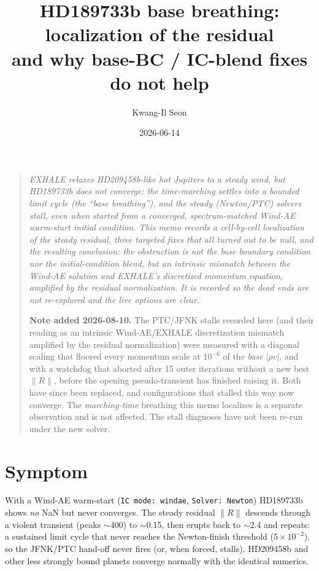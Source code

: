 \documentclass[english,a4paper]{my_memo}
\title{HD189733b base breathing: localization of the residual\\
and why base-BC / IC-blend fixes do not help}
\author{Kwang-Il Seon}
\date{2026-06-14}
\newcommand{\code}[1]{\texttt{#1}}
\begin{document}
\maketitle

\begin{quote}\small\itshape
EXHALE relaxes HD209458b-like hot Jupiters to a steady wind, but HD189733b
does not converge: the time-marching settles into a bounded limit cycle
(the ``base breathing''), and the steady (Newton/PTC) solvers stall,
even when started from a converged, spectrum-matched Wind-AE warm-start
initial condition. This memo records a cell-by-cell localization of the steady
residual, three targeted fixes that all turned out to be null, and the
resulting conclusion: the obstruction is not the base boundary condition
nor the initial-condition blend, but an intrinsic mismatch between the
Wind-AE solution and EXHALE's discretized momentum equation, amplified by
the residual normalization. It is recorded so the dead ends are not
re-explored and the live options are clear.

\medskip
\textbf{Note added 2026-08-10.} The PTC/JFNK stalls recorded here (and their
reading as an intrinsic Wind-AE/EXHALE discretization mismatch amplified by the
residual normalization) were measured with a diagonal scaling that floored
every momentum scale at $10^{-6}$ of the \emph{base} $|\rho v|$, and with a
watchdog that aborted after 15 outer iterations without a new best
$\lVert R\rVert$, before the opening pseudo-transient has finished raising
it. Both have since been replaced, and configurations that stalled this way now
converge. The
\emph{marching-time} breathing this memo localizes is a separate observation and
is not affected. The stall diagnoses have not been re-run under the new solver.
\end{quote}

\section{Symptom}
With a Wind-AE warm-start (\code{IC mode: windae}, \code{Solver: Newton})
HD189733b shows \emph{no} NaN but never converges. The steady residual
$\lVert R\rVert$ descends through a violent transient (peaks $\sim$400) to
$\sim$0.15, then erupts back to $\sim$2.4 and repeats: a sustained limit
cycle that never reaches the Newton-finish threshold ($5\times10^{-2}$), so
the JFNK/PTC hand-off never fires (or, when forced, stalls). HD209458b and
other less strongly bound planets converge normally with the identical
numerics.
\end{document}
